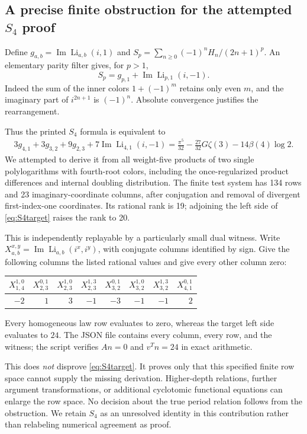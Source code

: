 \documentclass[11pt]{article}
\numberwithin{equation}{section}
\theoremstyle{definition}\newtheorem{definition}[theorem]{Definition}
\theoremstyle{remark}\newtheorem{remark}[theorem]{Remark}
\DeclareMathOperator{\Li}{Li}
\DeclareMathOperator{\Ima}{Im}
\begin{document}
\subsection{A precise finite obstruction for the attempted \texorpdfstring{$S_4$}{S4} proof}
Define $g_{a,b}=\Ima\Li_{a,b}(i,1)$ and
$S_p=\sum_{n\ge0}(-1)^nH_n/(2n+1)^p$.
An elementary parity filter gives, for $p>1$,
\begin{equation}\label{eq:Spfilter}
 S_p=g_{p,1}+\Ima\Li_{p,1}(i,-1).
\end{equation}
Indeed the sum of the inner colors $1+(-1)^m$ retains only even $m$,
and the imaginary part of $i^{2n+1}$ is $(-1)^n$.
Absolute convergence justifies the rearrangement.

Thus the printed $S_4$ formula is equivalent to
\begin{align}
3g_{4,1}+3g_{3,2}+9g_{2,3}
+7\Ima\Li_{4,1}(i,-1)
=\frac{\pi^5}{32}-\frac{27}{32}G\zeta(3)-14\beta(4)\log2.
\label{eq:S4target}
\end{align}
We attempted to derive it from all weight-five products of two
single polylogarithms with fourth-root colors, including the
once-regularized product differences and internal doubling distribution.
The finite test system has 134 rows and 23 imaginary-coordinate columns,
after conjugation and removal of divergent first-index-one coordinates.
Its rational rank is 19; adjoining the left side of
\eqref{eq:S4target} raises the rank to 20.

This is independently replayable by a particularly small dual witness.
Write $X_{a,b}^{x,y}=\Ima\Li_{a,b}(i^x,i^y)$, with conjugate columns
identified by sign. Give the following columns the listed rational
values and give every other column zero:
\begin{center}
\begin{tabular}{rrrrrrrr}
\toprule
$X_{1,4}^{1,0}$&$X_{2,3}^{0,1}$&$X_{2,3}^{1,0}$&$X_{2,3}^{1,3}$&
$X_{3,2}^{0,1}$&$X_{3,2}^{1,0}$&$X_{3,2}^{1,3}$&$X_{4,1}^{0,1}$\\
\midrule
$-2$&$1$&$3$&$-1$&$-3$&$-1$&$-1$&$2$\\
\bottomrule
\end{tabular}
\end{center}
Every homogeneous law row evaluates to zero, whereas the target left
side evaluates to $24$. The JSON file contains every column, every row,
and the witness; the script verifies $An=0$ and $v^Tn=24$ in exact
arithmetic.

This does \emph{not} disprove \eqref{eq:S4target}. It proves only that
this specified finite row space cannot supply the missing derivation.
Higher-depth relations, further argument transformations, or additional
cyclotomic functional equations can enlarge the row space. No decision
about the true period relation follows from the obstruction. We retain
$S_4$ as an unresolved identity in this contribution rather than
relabeling numerical agreement as proof.
\end{document}
